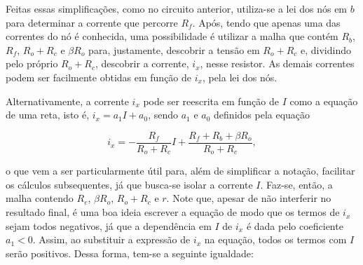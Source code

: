 \documentclass{article}
\numberwithin{equation}{section}
\newlength\Colsep
\begin{document}
\noindent\begin{minipage}{0.96\textwidth}
\begin{minipage}[c][8cm][c]{\dimexpr0.63\textwidth-0.5\Colsep\relax}
    \begin{center}
    \end{center}
\end{minipage} \hfill
\begin{minipage}[c][7cm][c]{\dimexpr0.37\textwidth-0.5\Colsep\relax}
    Feitas essas simplificações, como no circuito anterior, utiliza-se a lei dos nós em $b$ para determinar a corrente que percorre $R_{f}$. Após, tendo que apenas uma das correntes do nó é conhecida, uma possibilidade é utilizar a malha que contém $R_{b}$, $R_{f}$, $R_o + R_c$ e $\beta R_o$ para, justamente, descobrir a tensão em $R_o + R_c$ e, dividindo pelo próprio $R_o + R_c$, descobrir a corrente, $i_x$, nesse resistor. As demais correntes podem ser facilmente obtidas em função de $i_x$, pela lei dos nós.
\end{minipage}
\end{minipage}

\vspace{5mm}
\noindent Alternativamente, a corrente $i_x$ pode ser reescrita em função de $I$ como a equação de uma reta, isto é, $i_x = a_1I + a_0$, sendo $a_1$ e $a_0$ definidos pela equação

\begin{equation}
    i_x=-\dfrac{R_{f}}{R_o+R_c}I + \dfrac{R_{f}+R_b+\beta R_o}{R_o+R_c}, \label{eq:ix_Rth_fonte_arbitraria}
\end{equation}

\noindent o que vem a ser particularmente útil para, além de simplificar a notação, facilitar os cálculos subsequentes, já que busca-se isolar a corrente $I$. Faz-se, então, a malha contendo $R_e$, $\beta R_o$, $R_o + R_c$ e $r$. Note que, apesar de não interferir no resultado final, é uma boa ideia escrever a equação de modo que os termos de $i_x$ sejam todos negativos, já que a dependência em $I$ de $i_x$ é dada pelo coeficiente $a_1 < 0$. Assim, ao substituir a expressão de $i_x$ na equação, todos os termos com $I$ serão positivos. Dessa forma, tem-se a seguinte igualdade:
\end{document}

